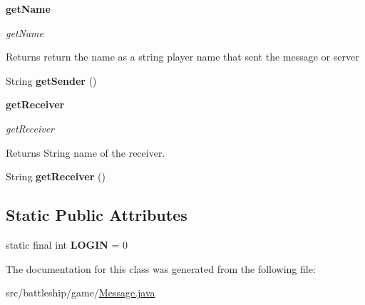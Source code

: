 \begin{Indent}{\bf get\+Name}\par
{\em get\+Name

\begin{DoxyReturn}{Returns}
return the name as a string player name that sent the message or server 
\end{DoxyReturn}
}\begin{DoxyCompactItemize}
\item 
\hypertarget{classbattleship_1_1game_1_1Message_a3ee2fbac6da1ba2f76908120e6430599}{}String {\bfseries get\+Sender} ()\label{classbattleship_1_1game_1_1Message_a3ee2fbac6da1ba2f76908120e6430599}

\end{DoxyCompactItemize}
\end{Indent}
\begin{Indent}{\bf get\+Receiver}\par
{\em get\+Receiver

\begin{DoxyReturn}{Returns}
String name of the receiver. 
\end{DoxyReturn}
}\begin{DoxyCompactItemize}
\item 
\hypertarget{classbattleship_1_1game_1_1Message_a9767cfb1c41179f479416fb841f29c22}{}String {\bfseries get\+Receiver} ()\label{classbattleship_1_1game_1_1Message_a9767cfb1c41179f479416fb841f29c22}

\end{DoxyCompactItemize}
\end{Indent}
\subsection*{Static Public Attributes}
\begin{DoxyCompactItemize}
\item 
\hypertarget{classbattleship_1_1game_1_1Message_ab42cffc552b1b74fca8c0a48c39ca479}{}static final int {\bfseries L\+O\+G\+I\+N} = 0\label{classbattleship_1_1game_1_1Message_ab42cffc552b1b74fca8c0a48c39ca479}

\end{DoxyCompactItemize}


The documentation for this class was generated from the following file\+:\begin{DoxyCompactItemize}
\item 
src/battleship/game/\hyperlink{Message_8java}{Message.\+java}\end{DoxyCompactItemize}
